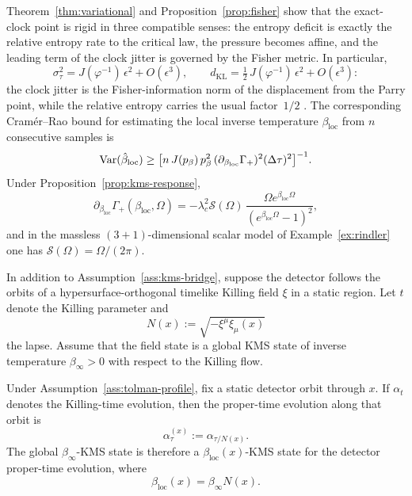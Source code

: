 \begin{remark}\label{rem:information-geometry}
Theorem~\ref{thm:variational} and Proposition~\ref{prop:fisher} show that the exact-clock point is rigid in three compatible senses: the entropy deficit is exactly the relative entropy rate to the critical law, the pressure becomes affine, and the leading term of the clock jitter is governed by the Fisher metric. In particular,
\[
\sigma_\tau^2
=
J(\varphi^{-1})\,\epsilon^2+O(\epsilon^3),
\qquad
d_{\mathrm{KL}}
=
\tfrac12\,J(\varphi^{-1})\,\epsilon^2+O(\epsilon^3):
\]
the clock jitter is the Fisher-information norm of the displacement from the Parry point, while the relative entropy carries the usual factor~$1/2$ \cite{CoverThomas2006}. The corresponding Cram\'er--Rao bound for estimating the local inverse temperature $\beta_{\mathrm{loc}}$ from $n$ consecutive samples is
\[
\mathrm{Var}(\hat\beta_{\mathrm{loc}})
\ge
\bigl[n\,J(p_\beta)\,p_\beta^2\,(\partial_{\beta_{\mathrm{loc}}}\Gamma_+)^2(\Delta\tau)^2\bigr]^{-1}.
\]
Under Proposition~\ref{prop:kms-response},
\[
\partial_{\beta_{\mathrm{loc}}}\Gamma_+(\beta_{\mathrm{loc}},\Omega)
=
-\lambda_c^2\mathcal S(\Omega)\,
\frac{\Omega e^{\beta_{\mathrm{loc}}\Omega}}{(e^{\beta_{\mathrm{loc}}\Omega}-1)^2},
\]
and in the massless $(3+1)$-dimensional scalar model of Example~\ref{ex:rindler} one has $\mathcal S(\Omega)=\Omega/(2\pi)$.
\end{remark}

\begin{assumption}\label{ass:tolman-profile}
In addition to Assumption~\ref{ass:kms-bridge}, suppose the detector follows the orbits of a hypersurface-orthogonal timelike Killing field $\xi$ in a static region. Let $t$ denote the Killing parameter and
\[
N(x):=\sqrt{-\xi^\mu\xi_\mu(x)}
\]
the lapse. Assume that the field state is a global KMS state of inverse temperature $\beta_\infty>0$ with respect to the Killing flow.
\end{assumption}

\begin{proposition}\label{prop:tolman-kms}
Under Assumption~\ref{ass:tolman-profile}, fix a static detector orbit through $x$. If $\alpha_t$ denotes the Killing-time evolution, then the proper-time evolution along that orbit is
\[
\alpha^{(x)}_\tau:=\alpha_{\tau/N(x)}.
\]
The global $\beta_\infty$-KMS state is therefore a $\beta_{\mathrm{loc}}(x)$-KMS state for the detector proper-time evolution, where
\begin{equation}\label{eq:tolman-law}
\beta_{\mathrm{loc}}(x)=\beta_\infty N(x).
\end{equation}
\end{proposition}

